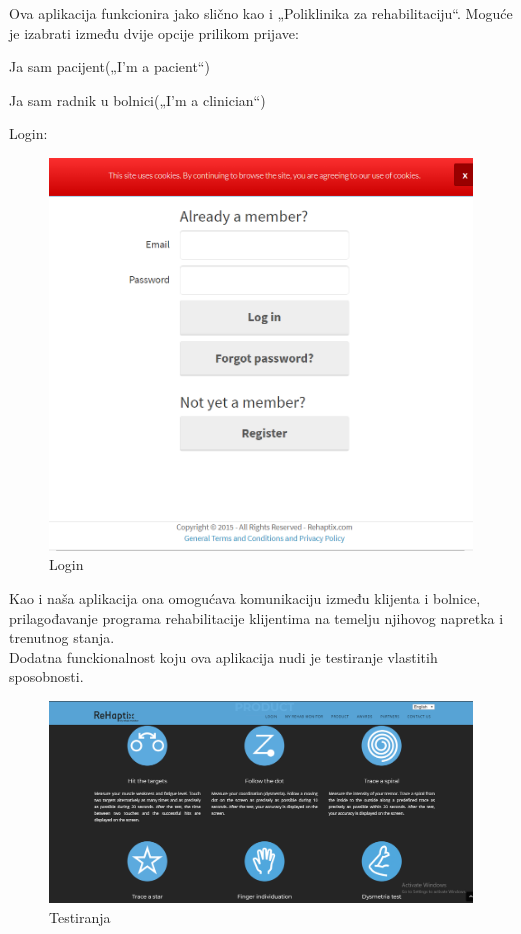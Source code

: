 	Ova aplikacija funkcionira jako slično kao i „Poliklinika za rehabilitaciju“. Moguće je izabrati između dvije opcije prilikom prijave: 
	\begin{packed_item}
		\item {Ja sam pacijent(„I'm a pacient“)}
		\item {Ja sam radnik u bolnici(„I'm a clinician“)}
	\end{packed_item}

	\noindent \large{Login:}
		\begin{figure}[h]
			\centering
			\includegraphics[scale=0.3]{slike/rehaptix2.png}
			\caption{Login}
		\end{figure}


	Kao i naša aplikacija ona omogućava komunikaciju između klijenta i bolnice, prilagođavanje programa rehabilitacije klijentima na temelju njihovog napretka i trenutnog stanja.\\
	Dodatna funckionalnost koju ova aplikacija nudi je testiranje vlastitih sposobnosti.\\
	
	\begin{figure}[h]
	\centering
	\includegraphics[scale=0.3]{slike/rehaptix3.png}
	\caption{Testiranja}
	\end{figure}

